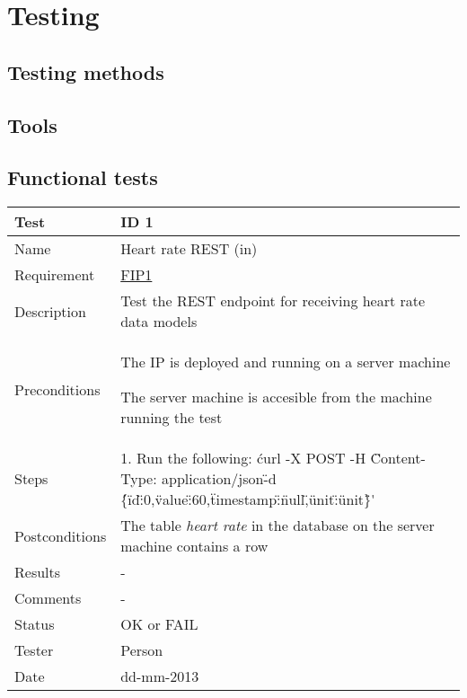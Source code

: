 
\chapter{Testing}

\label{Testing}


\section{Testing methods}

\section{Tools}

\section{Functional tests}

\begin{table}
\begin{center}
\begin{tabular}{ | l | p{10cm} | }
	\hline
	\textbf{Test}	&	\textbf{ID 1} \\
	\hline\noalign{\smallskip}\noalign{\smallskip}\hline
	Name				& Heart rate REST (in) \\
	Requirement			& \hyperref[table:reqip]{FIP1} \\
	Description			& Test the REST endpoint for receiving heart rate data models \\
	Preconditions		& 	\par The IP is deployed and running on a server machine 
							\par The server machine is accesible from the machine running the test \\
	Steps 				&	1. Run the following: \'curl -X POST -H \"Content-Type: application/json\" -d
							\'\{\"id\":0,\"value\":60,\"timestamp\":\"null\",\"unit\":\"unit\"\}\'
							\\
							
	Postconditions		& The table \textit{heart rate} in the database on the server machine contains a row \\
	Results				& - \\
	Comments			& - \\
	Status				& OK or FAIL \\
	Tester				& Person \\
	Date				& dd-mm-2013 \\
	\hline
\end{tabular}
\end{center}
\end{table}

